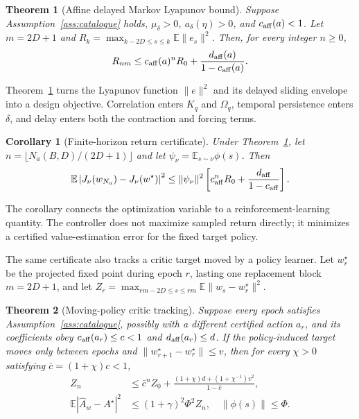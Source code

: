 \documentclass[journal]{IEEEtran}
\newtheorem{theorem}{Theorem}
\newtheorem{corollary}{Corollary}
\newcommand{\E}{\mathbb{E}}
\begin{document}
\begin{theorem}[Affine delayed Markov Lyapunov bound]
Suppose Assumption~\ref{ass:catalogue} holds, $\mu_\delta>0$, $a_\delta(\eta)>0$, and $c_{\rm aff}(a)<1$.
Let $m=2D+1$ and $R_k=\max_{k-2D\le s\le k}\E\|e_s\|^2$.
Then, for every integer $n\ge0$,
\begin{equation}
R_{nm}\le c_{\rm aff}(a)^nR_0+\frac{d_{\rm aff}(a)}{1-c_{\rm aff}(a)}.
\label{eq:affine-bound}
\end{equation}
\label{thm:affine}
\end{theorem}
Theorem~\ref{thm:affine} turns the Lyapunov function $\|e\|^2$ and its delayed sliding envelope into a design objective.
Correlation enters $K_q$ and $\Omega_q$, temporal persistence enters $\delta$, and delay enters both the contraction and forcing terms.

\begin{corollary}[Finite-horizon return certificate]
Under Theorem~\ref{thm:affine}, let $n=\lfloor N_a(B,D)/(2D+1)\rfloor$ and let $\psi_\nu=\E_{s\sim\nu}\phi(s)$.
Then
\begin{equation}
\E\left|J_\nu(w_{N_a})-J_\nu(w^\star)\right|^2
\le \|\psi_\nu\|^2
\left[c_{\rm aff}^{n}R_0+\frac{d_{\rm aff}}{1-c_{\rm aff}}\right].
\label{eq:return-certificate}
\end{equation}
\label{cor:return}
\end{corollary}

The corollary connects the optimization variable to a reinforcement-learning quantity.
The controller does not maximize sampled return directly; it minimizes a certified value-estimation error for the fixed target policy.

The same certificate also tracks a critic target moved by a policy learner.
Let $w_r^\star$ be the projected fixed point during epoch $r$, lasting one replacement block $m=2D+1$, and let $Z_r=\max_{rm-2D\le s\le rm}\E\|w_s-w_r^\star\|^2$.

\begin{theorem}[Moving-policy critic tracking]
Suppose every epoch satisfies Assumption~\ref{ass:catalogue}, possibly with a different certified action $a_r$, and its coefficients obey $c_{\rm aff}(a_r)\le c<1$ and $d_{\rm aff}(a_r)\le d$.
If the policy-induced target moves only between epochs and
$\|w_{r+1}^\star-w_r^\star\|\le v$, then for every $\chi>0$ satisfying $\bar c=(1+\chi)c<1$,
\begin{align}
Z_n&\le \bar c^n Z_0+
\frac{(1+\chi)d+(1+\chi^{-1})v^2}{1-\bar c},\label{eq:tracking-bound}\\
\E|\widehat A_w-A^\star|^2
&\le (1+\gamma)^2\Phi^2 Z_n,\quad \|\phi(s)\|\le\Phi.
\label{eq:advantage-transfer}
\end{align}
\label{thm:tracking}
\end{theorem}
\end{document}
